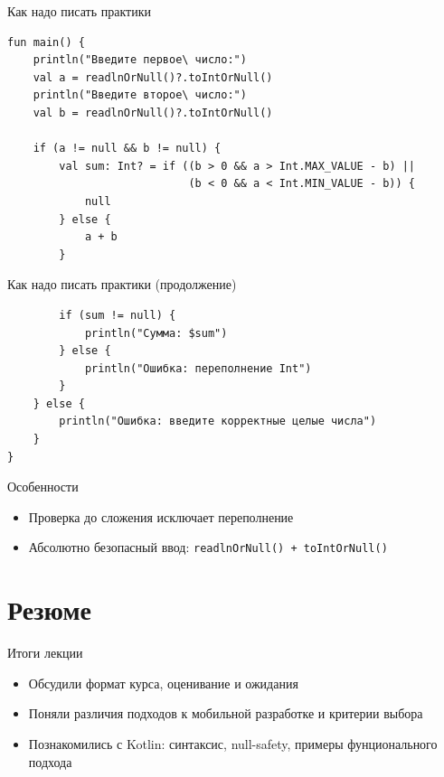 \documentclass[aspectratio=169]{beamer}
\begin{document}
\begin{frame}[fragile]{Как надо писать практики}
\lstset{language=Kotlin}
\begin{lstlisting}
fun main() {
    println("Введите первое\ число:")
    val a = readlnOrNull()?.toIntOrNull()
    println("Введите второе\ число:")
    val b = readlnOrNull()?.toIntOrNull()

    if (a != null && b != null) {
        val sum: Int? = if ((b > 0 && a > Int.MAX_VALUE - b) ||
                            (b < 0 && a < Int.MIN_VALUE - b)) {
            null
        } else {
            a + b
        }

\end{lstlisting}
\end{frame}


\begin{frame}[fragile]{Как надо писать практики (продолжение)}
\lstset{language=Kotlin}
\begin{lstlisting}
        if (sum != null) {
            println("Сумма: $sum")
        } else {
            println("Ошибка: переполнение Int")
        }
    } else {
        println("Ошибка: введите корректные целые числа")
    }
}
\end{lstlisting}
\begin{block}{Особенности}
\begin{itemize}
  \item Проверка до сложения исключает переполнение
  \item Абсолютно безопасный ввод: \texttt{readlnOrNull() + toIntOrNull()}
\end{itemize}
\end{block}
\end{frame}



\section{Резюме}

\begin{frame}{Итоги лекции}
  \begin{itemize}
    \item Обсудили формат курса, оценивание и ожидания
    \item Поняли различия подходов к мобильной разработке и критерии выбора
    \item Познакомились с Kotlin: синтаксис, null-safety, примеры фунционального подхода
  \end{itemize} %
\end{frame}
\end{document}
